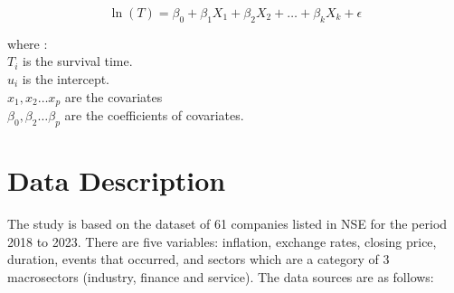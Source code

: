 \documentclass[twoside,a4paper,12pt]{article}
\begin{document}
\begin{equation}	
		\ln(T) = \beta_0 + \beta_1 X_1 + \beta_2 X_2 + \dots + \beta_k X_k + \epsilon \label{eq:1} 	
\end{equation}

where :\\
$T_i$ 	is the survival time.\\
$u_i$ 	is the intercept.\\
$x_1,x_2 \dots x_p$	 are the covariates\\
$\beta_0,\beta_2 \dots \beta_p$ 	are the coefficients of covariates.\\


\section*{Data Description}

The study is based on the dataset of 61 companies listed in NSE for the period 2018 to 2023. There are five variables: inflation, exchange rates, closing price, duration, events that occurred, and  sectors which are a category of 3 macrosectors (industry, finance and service). The data sources are as follows:
\end{document}
